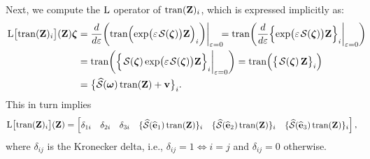 Next, we compute the $\operatorname{L}$ operator of $\operatorname{tran}(\mathbf{Z})_{i}$, which is expressed implicitly as:
\begin{align}
    \begin{split}
        \Lop\bigl[\trans(\mathbf{Z})_{i}\bigr](\mathbf{Z}) \boldsymbol{\zeta}&= 
        \frac{d}{d\varepsilon}\biggl(\trans\Bigl(\exp\bigl(\varepsilon\SL[\boldsymbol{\zeta}]\bigr)\mathbf{Z}\Bigr)_{i}\biggr)\biggr|_{\varepsilon=0}\!\!\! = 
        \trans\biggl(\frac{d}{d\varepsilon}\Bigl\{\exp\bigl(\varepsilon\SL[\boldsymbol{\zeta}]\bigr)\mathbf{Z}\Bigr\}_{i}\biggr|_{\varepsilon=0}\biggr) \!\!\!\!\!\!\\
        &= \trans\biggl(\Bigl\{\SL[\boldsymbol{\zeta}]\exp\bigl(\varepsilon\SL[\boldsymbol{\zeta}]\bigr)\mathbf{Z}\Bigr\}_{i}\biggr|_{\varepsilon=0}\biggr)
        = \trans\Bigl(\bigl\{\SL[\boldsymbol{\zeta}]\mathbf{Z}\bigr\}_{i}\Bigr)\\
        &= \bigl\{\widehat{\mathcal{S}}(\boldsymbol{\omega})\trans(\mathbf{Z}) + \mathbf{v}\bigr\}_{i}.
    \end{split}
\end{align}
This in turn implies
\begin{align}
    \operatorname{L}\bigl[\operatorname{tran}(\mathbf{Z})_{i}\bigr](\mathbf{Z}) = \begin{bmatrix}
        \delta_{1i} & \delta_{2i} & \delta_{3i} & \{\widehat{\mathcal{S}}(\widehat{\mathbf{e}}_1)\operatorname{tran}(\mathbf{Z})\}_i & \{\widehat{\mathcal{S}}(\widehat{\mathbf{e}}_2)\operatorname{tran}(\mathbf{Z})\}_i & \{\widehat{\mathcal{S}}(\widehat{\mathbf{e}}_3)\operatorname{tran}(\mathbf{Z})\}_i
    \end{bmatrix},
\end{align}
where $\delta_{ij}$ is the Kronecker delta, i.e., $\delta_{ij}=1 \iff i=j$ and $\delta_{ij}=0$ otherwise. 

